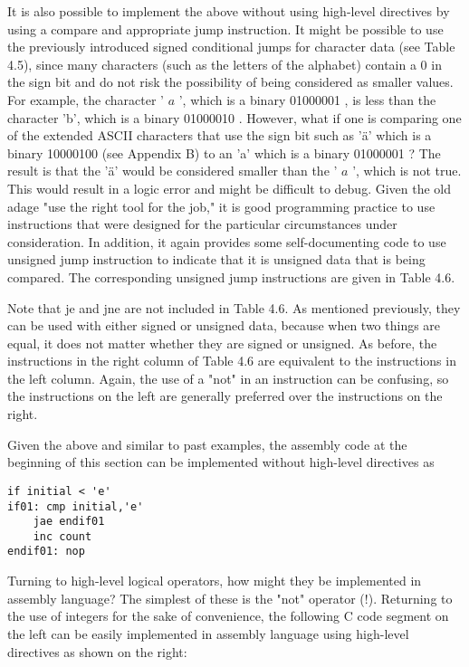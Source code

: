 \documentclass[10pt]{article}
\begin{document}
It is also possible to implement the above without using high-level directives by using a compare and appropriate jump instruction. It might be possible to use the previously introduced signed conditional jumps for character data (see Table 4.5), since many characters (such as the letters of the alphabet) contain a 0 in the sign bit and do not risk the possibility of being considered as smaller values. For example, the character ' $a$ ', which is a binary 01000001 , is less than the character 'b', which is a binary 01000010 . However, what if one is comparing one of the extended ASCII characters that use the sign bit such as 'ä' which is a binary 10000100 (see Appendix B) to an 'a' which is a binary 01000001 ? The result is that the 'ä' would be considered smaller than the ' $a$ ', which is not true. This would result in a logic error and might be difficult to debug. Given the old adage "use the right tool for the job," it is good programming practice to use instructions that were designed for the particular circumstances under consideration. In addition, it again provides some self-documenting code to use unsigned jump instruction to indicate that it is unsigned data that is being compared. The corresponding unsigned jump instructions are given in Table 4.6.

Note that je and jne are not included in Table 4.6. As mentioned previously, they can be used with either signed or unsigned data, because when two things are equal, it does not matter whether they are signed or unsigned. As before, the instructions in the right column of Table 4.6 are equivalent to the instructions in the left column. Again, the use of a "not" in an instruction can be confusing, so the instructions on the left are generally preferred over the instructions on the right.

Given the above and similar to past examples, the assembly code at the beginning of this section can be implemented without high-level directives as

\begin{verbatim}
if initial < 'e'
if01: cmp initial,'e'
    jae endif01
    inc count
endif01: nop
\end{verbatim}

Turning to high-level logical operators, how might they be implemented in assembly language? The simplest of these is the "not" operator (!). Returning to the use of integers for the sake of convenience, the following C code segment on\\
the left can be easily implemented in assembly language using high-level directives as shown on the right:
\end{document}
